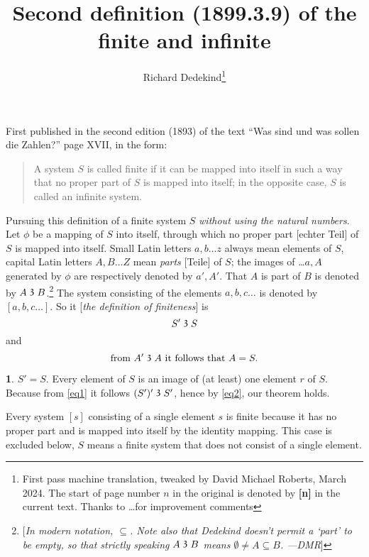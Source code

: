\documentclass[leqno,hidelinks,a4paper]{article}
\theoremstyle{definition}
\newtheorem{satz}{\protect\satzname}
\newcommand{\satzname}{}
\renewcommand{\satzname}{\hspace{-4pt}.\ Satz}%
\renewcommand{\satzname}{\hspace{-4pt}.\ Theorem}%
\newcommand\partof{\mathrel{\raisebox{0.45ex}{$\mathfrak{3}$}}}
\begin{document}
\title{Second definition (1899.3.9) of the finite and infinite}
\author{Richard Dedekind\thanks{First pass machine translation, tweaked by David Michael Roberts, March 2024. The start of page number $n$ in the original is denoted by \textbf{[n]} in the current text. Thanks to \ldots for improvement comments}}
\date{}
\maketitle

First published in the second edition (1893) of the text ``Was sind und was sollen die Zahlen?'' page XVII, in the form:

\begin{quote}
A system $S$ is called finite if it can be mapped into itself in such a way that no proper part of $S$ is mapped into itself; in the opposite case, $S$ is called an infinite system.
\end{quote}

Pursuing this definition of a finite system $S$ \emph{without using the natural numbers}.
Let $\phi$ be a mapping of $S$ into itself, through which no proper part [echter Teil] of $S$ is mapped into itself.
Small Latin letters $a, b \ldots z$ always mean elements of $S$, capital Latin letters $A, B \ldots Z$ mean \emph{parts} [Teile] of $S$; the images of \ldots $a, A$ generated by $\phi$ are respectively denoted by $a', A'$.
That $A$ is part of $B$ is denoted by $A \partof B$.\footnote{[\emph{In modern notation, $\subseteq$. Note also that Dedekind doesn't permit a `part' to be empty, so that strictly speaking $A\partof B$ means $\emptyset \neq A \subseteq B$. ---DMR}]} The system consisting of the elements $a, b, c \ldots $ is denoted by $[a, b, c \ldots]$.
So it [\emph{the definition of finiteness}] is
\begin{equation}\label{eq1}
				S' \partof S
\end{equation}
and
\begin{equation}\label{eq2}
		\text{from } A' \partof A \text{ it follows that } A = S.
\end{equation}

\begin{satz}\label{thm1}
$S' = S$. Every element of $S$ is an image of (at least) one element $r$ of $S$. Because from \eqref{eq1} it follows $(S')' \partof S'$, hence by \eqref{eq2}, our theorem holds.
\end{satz}

Every system $[s]$ consisting of a single element $s$ is finite because it has no proper part and is mapped into itself by the identity mapping.
This case is excluded below, $S$ means a finite system that does not consist of a single element.
\end{document}
